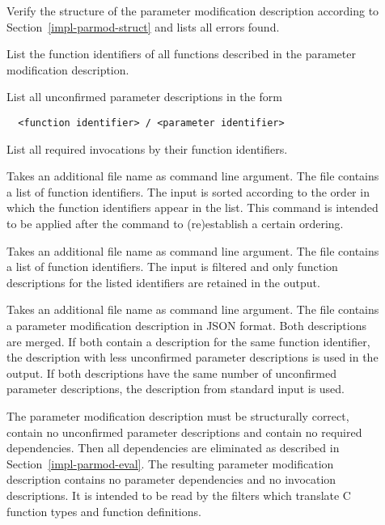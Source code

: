 \begin{description}

\item[]
Verify the structure of the parameter modification description 
according to Section~\ref{impl-parmod-struct} and lists all errors found.

\item[]
List the function identifiers of all functions described in the parameter modification description.

\item[] 
List all unconfirmed parameter descriptions in the form
\begin{verbatim}
  <function identifier> / <parameter identifier>
\end{verbatim}

\item[]
List all required invocations by their function identifiers.

\item[]
Takes an additional file name as command line argument. The file contains a list of function identifiers.
The input is sorted according to the order in which the function identifiers appear in the list. This command
is intended to be applied after the  command to (re)establish a certain ordering.

\item[]
Takes an additional file name as command line argument. The file contains a list of function identifiers.
The input is filtered and only function descriptions for the listed identifiers are retained in the output.

\item[]
Takes an additional file name as command line argument. The file contains a parameter modification description 
in JSON format. Both descriptions are merged. If both contain a description for the same function identifier,
the description with less unconfirmed parameter descriptions is used in the output. If both descriptions have 
the same number of unconfirmed parameter descriptions, the description from standard input is used.

\item[]
The parameter modification description must be structurally correct, contain no
unconfirmed parameter descriptions and contain no required dependencies. Then all dependencies are eliminated 
as described in Section~\ref{impl-parmod-eval}.
The resulting parameter modification description contains no parameter dependencies and
no invocation descriptions. It is intended to be read by the filters which translate C function types and function 
definitions.
\end{description}

